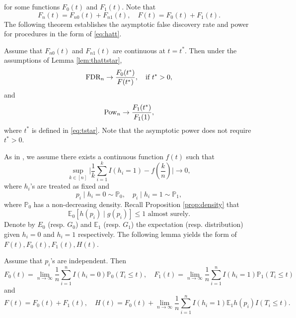 \documentclass{biometrika}
\newcommand{\FDR}{\textnormal{FDR}}
\newcommand{\Pow}{\textnormal{Pow}}
\newcommand{\lb}{\left(}
\newcommand{\rb}{\right)}
\newcommand{\E}{\mathbb{E}}
\renewcommand{\P}{\mathbb{P}}
\newcommand{\1}{\mathbf{1}}
\begin{document}
for some functions $F_{0}(t)$ and $F_{1}(t)$. Note that 
\[F_{n}(t) = F_{n0}(t) + F_{n1}(t), \quad F(t) = F_{0}(t) + F_{1}(t).\]
The following theorem establishes the asymptotic false discovery rate and power for procedures in the form of \eqref{eq:hatt}.
\begin{theorem}\label{thm:FDR_power}
  Assume that $F_{n0}(t)$ and $F_{n1}(t)$ are continuous at $t = t^{*}$. Then under the assumptions of Lemma \ref{lem:thattstar}, 
\[\FDR_{n}\rightarrow \frac{F_{0}(t^{*})}{F(t^{*})}, \quad \mbox{if }t^{*} > 0,\]
and
\[\Pow_{n}\rightarrow \frac{F_{1}(t^{*})}{F_{1}(1)},\]
where $t^{*}$ is defined in \eqref{eq:tstar}. Note that the asymptotic power does not require $t^{*} > 0$.
\end{theorem}

As in \cite{li2016accumulation}, we assume there exists a continuous function $f(t)$ such that
\begin{equation}
  \label{eq:ft}
  \sup_{k\in [n]}\bigg|\frac{1}{k}\sum_{i=1}^{k}I(h_{i} = 1) - f\lb\frac{k}{n}\rb\bigg|\rightarrow 0,
\end{equation}
where $h_{i}$'s are treated as fixed and 
\[p_{i}\mid h_{i} = 0\sim \P_{0}, \quad p_{i}\mid h_{i} = 1\sim \P_{1},\]
where $\P_{0}$ has a non-decreasing density. Recall Proposition \ref{prop:density} that 
\[\E_{0} [h(p_{i})\mid g(p_{i})]\le 1\,\, \mbox{almost surely}.\]
Denote by $E_{0}$ (resp. $G_{0}$) and $\E_{1}$ (resp. $G_{1}$) the expectation (resp. distribution) given $h_{i} = 0$ and $h_{i} = 1$ respectively. The following lemma yields the form of $F(t), F_{0}(t), F_{1}(t), H(t)$. 
\begin{lemma}\label{lem:uniform}
  Assume that $p_{i}$'s are independent. Then 
\[F_{0}(t) = \lim_{n\rightarrow \infty}\frac{1}{n}\sum_{i=1}^{n}I(h_{i} = 0)\P_{0}(T_{i}\le t), \quad F_{1}(t) = \lim_{n\rightarrow \infty}\frac{1}{n}\sum_{i=1}^{n}I(h_{i} = 1)\P_{1}(T_{i}\le t)\]
and 
\[F(t) = F_{0}(t) + F_{1}(t), \quad H(t) = F_{0}(t) + \lim_{n\rightarrow \infty}\frac{1}{n}\sum_{i=1}^{n}I(h_{i} = 1)\E_{1}h(p_{i})I(T_{i}\le t).\]
\end{lemma}
\end{document}
